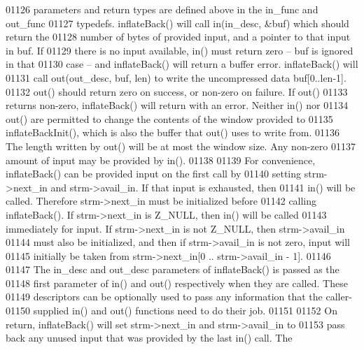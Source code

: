 \begin{DoxyCode}
01126 \textcolor{comment}{   parameters and return types are defined above in the in\_func and out\_func}
01127 \textcolor{comment}{   typedefs.  inflateBack() will call in(in\_desc, &buf) which should return the}
01128 \textcolor{comment}{   number of bytes of provided input, and a pointer to that input in buf.  If}
01129 \textcolor{comment}{   there is no input available, in() must return zero -- buf is ignored in that}
01130 \textcolor{comment}{   case -- and inflateBack() will return a buffer error.  inflateBack() will}
01131 \textcolor{comment}{   call out(out\_desc, buf, len) to write the uncompressed data buf[0..len-1].}
01132 \textcolor{comment}{   out() should return zero on success, or non-zero on failure.  If out()}
01133 \textcolor{comment}{   returns non-zero, inflateBack() will return with an error.  Neither in() nor}
01134 \textcolor{comment}{   out() are permitted to change the contents of the window provided to}
01135 \textcolor{comment}{   inflateBackInit(), which is also the buffer that out() uses to write from.}
01136 \textcolor{comment}{   The length written by out() will be at most the window size.  Any non-zero}
01137 \textcolor{comment}{   amount of input may be provided by in().}
01138 \textcolor{comment}{}
01139 \textcolor{comment}{     For convenience, inflateBack() can be provided input on the first call by}
01140 \textcolor{comment}{   setting strm->next\_in and strm->avail\_in.  If that input is exhausted, then}
01141 \textcolor{comment}{   in() will be called.  Therefore strm->next\_in must be initialized before}
01142 \textcolor{comment}{   calling inflateBack().  If strm->next\_in is Z\_NULL, then in() will be called}
01143 \textcolor{comment}{   immediately for input.  If strm->next\_in is not Z\_NULL, then strm->avail\_in}
01144 \textcolor{comment}{   must also be initialized, and then if strm->avail\_in is not zero, input will}
01145 \textcolor{comment}{   initially be taken from strm->next\_in[0 ..  strm->avail\_in - 1].}
01146 \textcolor{comment}{}
01147 \textcolor{comment}{     The in\_desc and out\_desc parameters of inflateBack() is passed as the}
01148 \textcolor{comment}{   first parameter of in() and out() respectively when they are called.  These}
01149 \textcolor{comment}{   descriptors can be optionally used to pass any information that the caller-}
01150 \textcolor{comment}{   supplied in() and out() functions need to do their job.}
01151 \textcolor{comment}{}
01152 \textcolor{comment}{     On return, inflateBack() will set strm->next\_in and strm->avail\_in to}
01153 \textcolor{comment}{   pass back any unused input that was provided by the last in() call.  The}

\end{DoxyCode}

